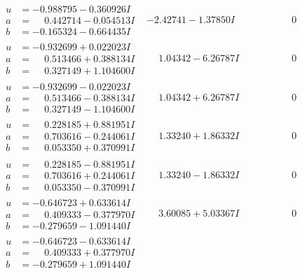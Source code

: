 \documentclass[1p]{elsarticle_modified}
\theoremstyle{definition}
\begin{document}
$$\begin{array}{c|c|c}
\begin{aligned}
u &= -0.988795 - 0.360926 I \\
a &= \phantom{-}0.442714 - 0.054513 I \\
b &= -0.165324 - 0.664435 I\end{aligned}
 & -2.42741 - 1.37850 I & \phantom{-0.000000 } 0 \\ \hline\begin{aligned}
u &= -0.932699 + 0.022023 I \\
a &= \phantom{-}0.513466 + 0.388134 I \\
b &= \phantom{-}0.327149 + 1.104600 I\end{aligned}
 & \phantom{-}1.04342 - 6.26787 I & \phantom{-0.000000 } 0 \\ \hline\begin{aligned}
u &= -0.932699 - 0.022023 I \\
a &= \phantom{-}0.513466 - 0.388134 I \\
b &= \phantom{-}0.327149 - 1.104600 I\end{aligned}
 & \phantom{-}1.04342 + 6.26787 I & \phantom{-0.000000 } 0 \\ \hline\begin{aligned}
u &= \phantom{-}0.228185 + 0.881951 I \\
a &= \phantom{-}0.703616 - 0.244061 I \\
b &= \phantom{-}0.053350 + 0.370991 I\end{aligned}
 & \phantom{-}1.33240 + 1.86332 I & \phantom{-0.000000 } 0 \\ \hline\begin{aligned}
u &= \phantom{-}0.228185 - 0.881951 I \\
a &= \phantom{-}0.703616 + 0.244061 I \\
b &= \phantom{-}0.053350 - 0.370991 I\end{aligned}
 & \phantom{-}1.33240 - 1.86332 I & \phantom{-0.000000 } 0 \\ \hline\begin{aligned}
u &= -0.646723 + 0.633614 I \\
a &= \phantom{-}0.409333 - 0.377970 I \\
b &= -0.279659 - 1.091440 I\end{aligned}
 & \phantom{-}3.60085 + 5.03367 I & \phantom{-0.000000 } 0 \\ \hline\begin{aligned}
u &= -0.646723 - 0.633614 I \\
a &= \phantom{-}0.409333 + 0.377970 I \\
b &= -0.279659 + 1.091440 I\end{aligned}

\end{array}$$
\end{document}
